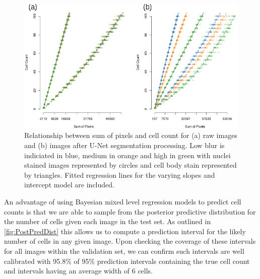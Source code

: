\documentclass[isoft]{poster_class_UofC}
\begin{document}
\begin{poster}
             \vspace{1cm}
           \begin{figure}
            \centering
            \captionsetup{type=figure}
            \includegraphics[scale=2]{./images/rawVUnet.png}
            \caption{Relationship between sum of pixels and cell count for (a) raw images and (b) images after U-Net segmentation processing. Low blur is indiciated in blue, medium in orange and high in green with nuclei stained images represented by circles and cell body stain represented by triangles. Fitted regression lines for the varying slopes and intercept model are included.}
            \label{fig:Results}
        \end{figure}   
            \vspace{1cm}

An advantage of using Bayesian mixed level regression models to predict cell counts is that we are able to sample from the posterior predictive distribution for the number of cells given each image in the test set.  As outlined in \ref{fig:PostPredDist} this allows us to compute a prediction interval for the likely number of cells in any given image.  Upon checking the coverage of these intervals for all images within the validation set, we can confirm such intervals are well calibrated with 95.8\% of 95\% prediction intervals containing the true cell count and intervals having an average width of 6 cells.


\end{poster}
\end{document}

